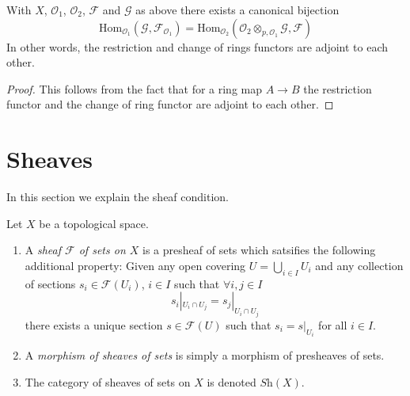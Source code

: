 \begin{lemma}
\label{lemma-adjointness-tensor-restrict-presheaves}
With $X$, $\mathcal{O}_1$, $\mathcal{O}_2$, $\mathcal{F}$ and
$\mathcal{G}$ as above there exists a canonical bijection
$$
\text{Hom}_{\mathcal{O}_1}(\mathcal{G}, \mathcal{F}_{\mathcal{O}_1})
=
\text{Hom}_{\mathcal{O}_2}(
\mathcal{O}_2 \otimes_{p, \mathcal{O}_1} \mathcal{G},
\mathcal{F}
)
$$
In other words, the restriction and change of rings functors
are adjoint to each other.
\end{lemma}

\begin{proof}
This follows from the fact that for a ring map
$A \to B$ the restriction functor and the change
of ring functor are adjoint to each other.
\end{proof}





\section{Sheaves}
\label{section-sheaves}

\noindent
In this section we explain the sheaf condition.

\begin{definition}
\label{definition-sheaf}
Let $X$ be a topological space.
\begin{enumerate}
\item A {\it sheaf $\mathcal{F}$ of sets on $X$} is a presheaf
of sets which satsifies the following additional property: Given
any open covering $U = \bigcup_{i \in I} U_i$ and any collection
of sections $s_i \in \mathcal{F}(U_i)$, $i \in I$ such that
$\forall i,j\in I$
$$
s_i|_{U_i \cap U_j} = s_j|_{U_i \cap U_j}
$$
there exists a unique section $s \in \mathcal{F}(U)$ such that
$s_i = s|_{U_i}$ for all $i \in I$.
\item A {\it morphism of sheaves of sets} is simply a
morphism of presheaves of sets.
\item The category of sheaves of sets on $X$ is denoted
$\textit{Sh}(X)$.
\end{enumerate}
\end{definition}

